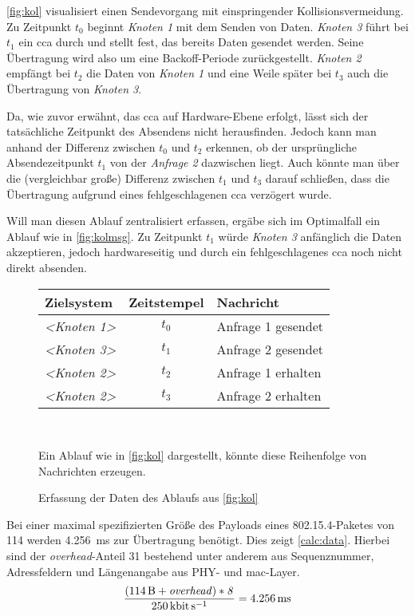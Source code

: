 \autoref{fig:kol} visualisiert einen Sendevorgang mit einspringender
Kollisionsvermeidung. Zu Zeitpunkt $t_0$ beginnt \emph{Knoten
1} mit dem Senden von Daten. \emph{Knoten 3} führt bei $t_1$ ein \gls{cca}
durch und stellt fest, das bereits Daten gesendet werden. Seine Übertragung
wird also um eine Backoff-Periode zurückgestellt. \emph{Knoten 2} empfängt bei
$t_2$ die Daten von \emph{Knoten 1} und eine Weile später bei $t_3$ auch die
Übertragung von \emph{Knoten 3}. 

Da, wie zuvor erwähnt, das \gls{cca} auf Hardware-Ebene erfolgt, lässt sich der
tatsächliche Zeitpunkt des Absendens nicht herausfinden. Jedoch kann man anhand
der Differenz zwischen $t_0$ und $t_2$ erkennen, ob der ursprüngliche
Absendezeitpunkt $t_1$ von der \emph{Anfrage 2} dazwischen liegt. Auch könnte
man über die (vergleichbar große) Differenz zwischen $t_1$ und $t_3$ darauf
schließen, dass die Übertragung aufgrund eines fehlgeschlagenen \gls{cca}
verzögert wurde.

Will man diesen Ablauf zentralisiert erfassen, ergäbe sich im Optimalfall ein
Ablauf wie in \autoref{fig:kolmsg}. Zu Zeitpunkt $t_1$ würde \emph{Knoten 3}
anfänglich die Daten akzeptieren, jedoch hardwareseitig und durch ein
fehlgeschlagenes \gls{cca} noch nicht direkt absenden.

\begin{figure}[!ht]
\centering
\par\begin{tabu}{l c l}
Zielsystem & Zeitstempel & Nachricht\\
\hline
\emph{<Knoten 1>} & \emph{$t_0$} & Anfrage 1 gesendet\\ 
\emph{<Knoten 3>} & \emph{$t_1$} & Anfrage 2 gesendet\\
\emph{<Knoten 2>} & \emph{$t_2$} & Anfrage 1 erhalten\\
\emph{<Knoten 2>} & \emph{$t_3$} & Anfrage 2 erhalten\\
\hline
\end{tabu}\\
\caption{Erfassung der Daten des Ablaufs aus \autoref{fig:kol}}{Ein Ablauf
wie in \autoref{fig:kol} dargestellt, könnte diese Reihenfolge von
Nachrichten erzeugen.}
\label{fig:kolmsg}
\end{figure}

Bei einer maximal spezifizierten Größe des Payloads eines
802.15.4-Paketes von \SI{114}{\byte} werden \SI{4.256}{\milli\second}
zur Übertragung benötigt. Dies zeigt \autoref{calc:data}. Hierbei sind der
\emph{overhead}-Anteil \SI{31}{\byte} bestehend unter anderem aus
Sequenznummer, Adressfeldern und Längenangabe aus PHY- und
\gls{mac}-Layer.
\begin{align}\label{calc:data}
\frac{(\SI{114}{\byte}+\mathit{overhead)*8}}{\SI{250}{\kilo\bit\per\second}}=\SI{4.256}{\milli\second}
\end{align}

